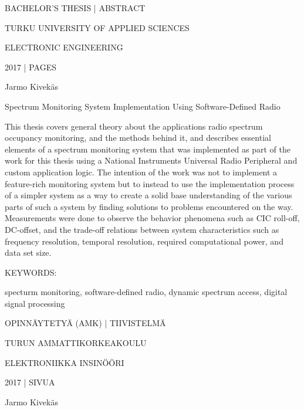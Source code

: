 BACHELOR'S THESIS | ABSTRACT

TURKU UNIVERSITY OF APPLIED SCIENCES

ELECTRONIC ENGINEERING

2017 | \pageref{LastPage} PAGES


\vspace{10mm}
{\Large Jarmo Kivekäs \par}

\vspace{10mm}
{\huge Spectrum Monitoring System Implementation Using Software-Defined Radio \par}

\vspace{10mm}



This thesis covers general theory about the applications radio spectrum occupancy
monitoring, and the methods behind it, and describes essential elements of a
spectrum monitoring system that was implemented as part of the work for this
thesis using a National Instruments Universal Radio Peripheral and custom
application logic. The intention of the work was not to implement a feature-rich
monitoring system but to instead to use the implementation process of a simpler
system as a way to create a solid base understanding of the various parts of such
a system by finding solutions to problems encountered on the way.
Measurements were done to observe the behavior phenomena such as CIC roll-off,
DC-offset, and the trade-off relations between system characteristics such as
frequency resolution, temporal resolution, required computational power,
and data set size.



\vspace{30mm}

KEYWORDS:

specturm monitoring, software-defined radio, dynamic spectrum access, digital signal processing



\clearpage


OPINNÄYTETYÄ (AMK) | TIIVISTELMÄ

TURUN AMMATTIKORKEAKOULU

ELEKTRONIIKKA INSINÖÖRI

2017 | \pageref{LastPage} SIVUA


\vspace{10mm}
{\Large Jarmo Kivekäs \par}

